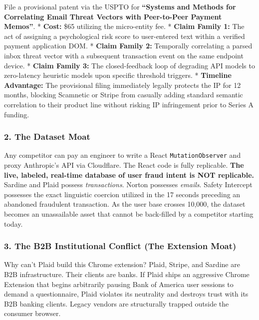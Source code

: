\documentclass[
]{article}
\begin{document}
File a provisional patent via the USPTO for \textbf{``Systems and
Methods for Correlating Email Threat Vectors with Peer-to-Peer Payment
Memos''}. * \textbf{Cost:} \$65 utilizing the micro-entity fee. *
\textbf{Claim Family 1:} The act of assigning a psychological risk score
to user-entered text within a verified payment application DOM. *
\textbf{Claim Family 2:} Temporally correlating a parsed inbox threat
vector with a subsequent transaction event on the same endpoint device.
* \textbf{Claim Family 3:} The closed-feedback loop of degrading API
models to zero-latency heuristic models upon specific threshold
triggers. * \textbf{Timeline Advantage:} The provisional filing
immediately legally protects the IP for 12 months, blocking Scamnetic or
Stripe from casually adding standard semantic correlation to their
product line without risking IP infringement prior to Series A funding.

\subsubsection{2. The Dataset Moat}\label{the-dataset-moat-1}

Any competitor can pay an engineer to write a React
\texttt{MutationObserver} and proxy Anthropic's API via Cloudflare. The
React code is fully replicable. \textbf{The live, labeled, real-time
database of user fraud intent is NOT replicable.} Sardine and Plaid
possess \emph{transactions}. Norton possesses \emph{emails}. Safety
Intercept possesses the exact linguistic coercion utilized in the 17
seconds preceding an abandoned fraudulent transaction. As the user base
crosses 10,000, the dataset becomes an unassailable asset that cannot be
back-filled by a competitor starting today.

\subsubsection{3. The B2B Institutional Conflict (The Extension
Moat)}\label{the-b2b-institutional-conflict-the-extension-moat}

Why can't Plaid build this Chrome extension? Plaid, Stripe, and Sardine
are B2B infrastructure. Their clients are banks. If Plaid ships an
aggressive Chrome Extension that begins arbitrarily pausing Bank of
America user sessions to demand a questionnaire, Plaid violates its
neutrality and destroys trust with its B2B banking clients. Legacy
vendors are structurally trapped outside the consumer browser.
\end{document}
